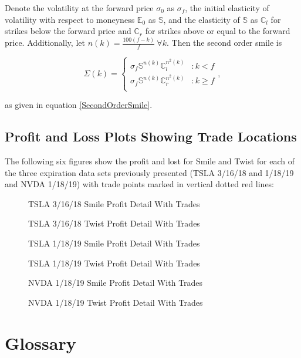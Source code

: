 \documentclass[12pt, a4paper, notitlepage]{article}
\numberwithin{equation}{subsection}
\numberwithin{figure}{subsection}
\numberwithin{table}{subsection}
\newcommand{\img}[3]
{
    \begin{figure}[H]
	\caption{#1}
	\centerline{\fbox{\texttt{[image: \#2]}}}
	\label{#3}
    \end{figure}
}
\begin{document}
Denote the volatility at the forward price $\sigma_0$ as $\sigma_f$, the initial elasticity of volatility with respect to moneyness $\mathbb{E}_0$ as $\mathbb{S}$, and the elasticity of $\mathbb{S}$ as $\mathbb{C}_l$ for strikes below the forward price and $\mathbb{C}_r$ for strikes above or equal to the forward price.  Additionally, let $n(k) = \frac{100\left(f-k\right)}{f} \ \forall k$.  Then the second order smile is

\begin{equation*}
\Sigma(k) = \begin{cases}
			\sigma_f\mathbb{S}^{n(k)}\mathbb{C}_l^{n^{2}(k)} & : k < f	\\
            \sigma_f\mathbb{S}^{n(k)}\mathbb{C}_r^{n^{2}(k)} & : k \geq f	\\
        \end{cases},
\end{equation*}

as given in equation \ref{SecondOrderSmile}.

\subsection{Profit and Loss Plots Showing Trade Locations}\label{subsec:PlotsWithTradeLocationAppendix}
The following six figures show the profit and lost for Smile and Twist for each of the three expiration data sets previously presented (TSLA 3/16/18 and 1/18/19 and NVDA 1/18/19) with trade points marked in vertical dotted red lines:

\img{TSLA 3/16/18 Smile Profit Detail With Trades}{TSLA_Mar_SmileWithTrades}{fig:TSLA_Mar_SmileWithTrades}

\img{TSLA 3/16/18 Twist Profit Detail With Trades}{TSLA_Mar_TwistWithTrades}{fig:TSLA_Mar_TwistWithTrades}

\img{TSLA 1/18/19 Smile Profit Detail With Trades}{TSLA_Jan_SmileWithTrades}{fig:TSLA_Jan_SmileWithTrades}

\img{TSLA 1/18/19 Twist Profit Detail With Trades}{TSLA_Jan_TwistWithTrades}{fig:TSLA_Jan_TwistWithTrades}

\img{NVDA 1/18/19 Smile Profit Detail With Trades}{NVDA_Jan_SmileWithTrades}{fig:NVDA_Jan_SmileWithTrades}

\img{NVDA 1/18/19 Twist Profit Detail With Trades}{NVDA_Jan_TwistWithTrades}{fig:NVDA_Jan_TwistWithTrades}

\newpage
\section{Glossary} \label{Glossary}
\end{document}
